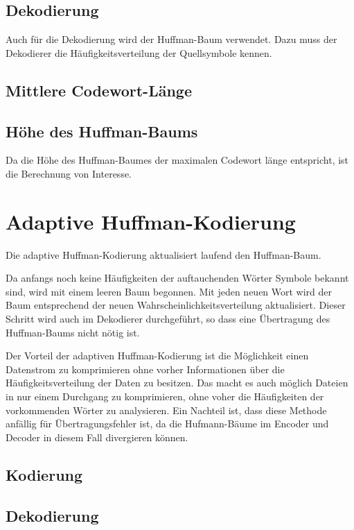 \documentclass[twoside,11pt,a4paper]{article}
\theoremstyle{break}
\begin{document}
\subsection{Dekodierung}

Auch für die Dekodierung wird der Huffman-Baum verwendet. Dazu muss der
Dekodierer die Häufigkeitsverteilung der Quellsymbole kennen.

\subsection{Mittlere Codewort-Länge}



\subsection{Höhe des Huffman-Baums}

Da die Höhe des Huffman-Baumes der maximalen Codewort länge entspricht,
ist die Berechnung von Interesse.

\section{Adaptive Huffman-Kodierung}

Die adaptive Huffman-Kodierung aktualisiert laufend den Huffman-Baum.

Da anfangs noch keine Häufigkeiten der auftauchenden Wörter Symbole bekannt
sind, wird mit einem leeren Baum begonnen. Mit jeden neuen Wort wird der Baum
entsprechend der neuen Wahrscheinlichkeitsverteilung aktualisiert. Dieser
Schritt wird auch im Dekodierer durchgeführt, so dass eine Übertragung des
Huffman-Baums nicht nötig ist.

Der Vorteil der adaptiven Huffman-Kodierung ist die Möglichkeit einen Datenstrom
zu komprimieren ohne vorher Informationen über die Häufigkeitsverteilung der
Daten zu besitzen. Das macht es auch möglich Dateien in nur einem Durchgang zu
komprimieren, ohne voher die Häufigkeiten der vorkommenden Wörter zu
analysieren. Ein Nachteil ist, dass diese Methode anfällig für
Übertragungsfehler ist, da die Hufmann-Bäume im Encoder und Decoder in diesem
Fall divergieren können.

\subsection{Kodierung}

\subsection{Dekodierung}
\end{document}
